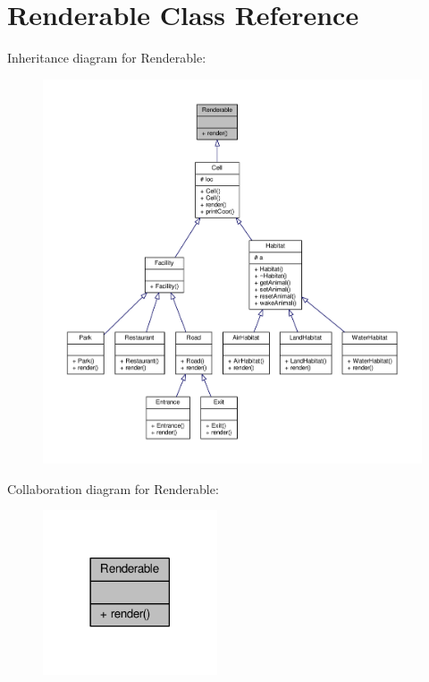 \hypertarget{classRenderable}{}\section{Renderable Class Reference}
\label{classRenderable}


Inheritance diagram for Renderable\+:
\nopagebreak
\begin{figure}[H]
\begin{center}
\leavevmode
\includegraphics[width=350pt]{classRenderable__inherit__graph}
\end{center}
\end{figure}


Collaboration diagram for Renderable\+:
\nopagebreak
\begin{figure}[H]
\begin{center}
\leavevmode
\includegraphics[width=146pt]{classRenderable__coll__graph}
\end{center}
\end{figure}
